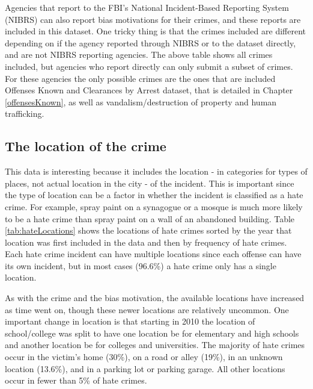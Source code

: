 \documentclass[
  12pt,
  openany]{book}
\begin{document}
Agencies that report to the FBI's National Incident-Based Reporting System (NIBRS) can also report bias motivations for their crimes, and these reports are included in this dataset. One tricky thing is that the crimes included are different depending on if the agency reported through NIBRS or to the dataset directly, and are not NIBRS reporting agencies. The above table shows all crimes included, but agencies who report directly can only submit a subset of crimes. For these agencies the only possible crimes are the ones that are included Offenses Known and Clearances by Arrest dataset, that is detailed in Chapter \ref{offensesKnown}, as well as vandalism/destruction of property and human trafficking.

\hypertarget{the-location-of-the-crime}{%
\subsection{The location of the crime}\label{the-location-of-the-crime}}

This data is interesting because it includes the location - in categories for types of places, not actual location in the city - of the incident. This is important since the type of location can be a factor in whether the incident is classified as a hate crime. For example, spray paint on a synagogue or a mosque is much more likely to be a hate crime than spray paint on a wall of an abandoned building. Table \ref{tab:hateLocations} shows the locations of hate crimes sorted by the year that location was first included in the data and then by frequency of hate crimes. Each hate crime incident can have multiple locations since each offense can have its own incident, but in most cases (96.6\%) a hate crime only has a single location.

As with the crime and the bias motivation, the available locations have increased as time went on, though these newer locations are relatively uncommon. One important change in location is that starting in 2010 the location of school/college was split to have one location be for elementary and high schools and another location be for colleges and universities. The majority of hate crimes occur in the victim's home (30\%), on a road or alley (19\%), in an unknown location (13.6\%), and in a parking lot or parking garage. All other locations occur in fewer than 5\% of hate crimes.
\end{document}
